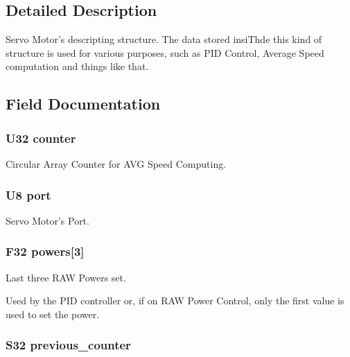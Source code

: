 \subsection{Detailed Description}
Servo Motor's descripting structure. The data stored insiThde this kind of structure is used for various purposes, such as PID Control, Average Speed computation and things like that. 

\subsection{Field Documentation}
\hypertarget{structmotor__t_a254d07b5f7c8ed7b181a5e069a438697}{
\subsubsection[{counter}]{\setlength{\rightskip}{0pt plus 5cm}U32 {\bf counter}}}
\label{structmotor__t_a254d07b5f7c8ed7b181a5e069a438697}


Circular Array Counter for AVG Speed Computing. 

\hypertarget{structmotor__t_afddeb57a376d21ebc28060146d46c608}{
\subsubsection[{port}]{\setlength{\rightskip}{0pt plus 5cm}U8 {\bf port}}}
\label{structmotor__t_afddeb57a376d21ebc28060146d46c608}


Servo Motor's Port. 

\hypertarget{structmotor__t_ae99d8af7a3f14d868771f3dad4041d76}{
\subsubsection[{powers}]{\setlength{\rightskip}{0pt plus 5cm}F32 {\bf powers}\mbox{[}3\mbox{]}}}
\label{structmotor__t_ae99d8af7a3f14d868771f3dad4041d76}


Last three RAW Powers set. 

Used by the PID controller or, if on RAW Power Control, only the first value is used to set the power. \hypertarget{structmotor__t_aed14003f4afb01bfd7d28c672c4915dc}{
\subsubsection[{previous\_\-counter}]{\setlength{\rightskip}{0pt plus 5cm}S32 {\bf previous\_\-counter}}}
\label{structmotor__t_aed14003f4afb01bfd7d28c672c4915dc}


